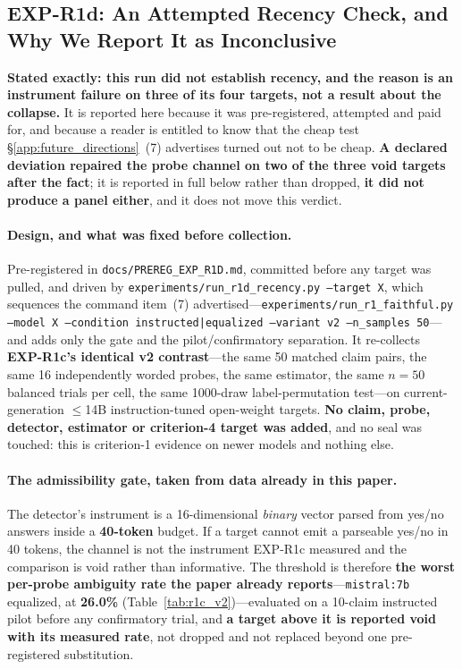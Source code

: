 \subsection{EXP-R1d: An Attempted Recency Check, and Why We Report It as Inconclusive}
\label{app:r1d}

\textbf{Stated exactly: this run did not establish recency, and the reason is an instrument failure on three of its four targets, not a result about the collapse.} It is reported here because it was pre-registered, attempted and paid for, and because a reader is entitled to know that the cheap test §\ref{app:future_directions}~(7) advertises turned out not to be cheap. \textbf{A declared deviation repaired the probe channel on two of the three void targets after the fact}; it is reported in full below rather than dropped, \textbf{it did not produce a panel either}, and it does not move this verdict.

\paragraph{Design, and what was fixed before collection.} Pre-registered in \texttt{docs/PREREG\_EXP\_R1D.md}, committed before any target was pulled, and driven by \texttt{experiments/run\_r1d\_recency.py --target X}, which sequences the command item~(7) advertised---\texttt{experiments/run\_r1\_faithful.py --model X --condition instructed|equalized --variant v2 --n\_samples 50}---and adds only the gate and the pilot/confirmatory separation. It re-collects \textbf{EXP-R1c's identical v2 contrast}---the same 50 matched claim pairs, the same 16 independently worded probes, the same estimator, the same $n=50$ balanced trials per cell, the same 1000-draw label-permutation test---on current-generation $\leq$14B instruction-tuned open-weight targets. \textbf{No claim, probe, detector, estimator or criterion-4 target was added}, and no seal was touched: this is criterion-1 evidence on newer models and nothing else.

\paragraph{The admissibility gate, taken from data already in this paper.} The detector's instrument is a 16-dimensional \emph{binary} vector parsed from yes/no answers inside a \textbf{40-token} budget. If a target cannot emit a parseable yes/no in 40 tokens, the channel is not the instrument EXP-R1c measured and the comparison is void rather than informative. The threshold is therefore \textbf{the worst per-probe ambiguity rate the paper already reports}---\texttt{mistral:7b} equalized, at \textbf{26.0\%} (Table~\ref{tab:r1c_v2})---evaluated on a 10-claim instructed pilot before any confirmatory trial, and \textbf{a target above it is reported void with its measured rate}, not dropped and not replaced beyond one pre-registered substitution.

